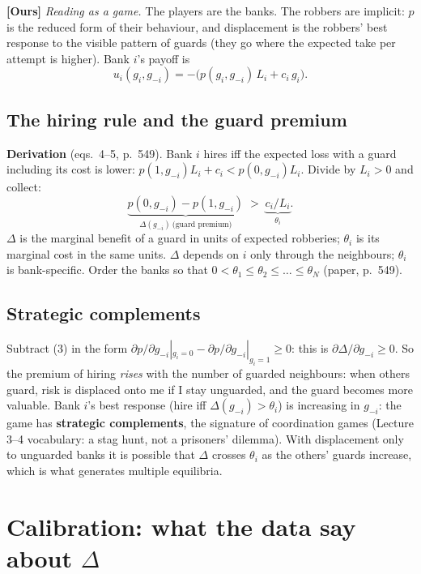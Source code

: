 \documentclass[11pt,a4paper]{article}
\newcommand{\ours}{\textbf{[Ours]}}
\newcommand{\Dl}{\Delta}
\begin{document}
\ours{} \emph{Reading as a game.} The players are the banks. The robbers are implicit: $p$ is the
reduced form of their behaviour, and displacement is the robbers' best response to the visible
pattern of guards (they go where the expected take per attempt is higher). Bank $i$'s payoff is
\[
  u_i(g_i,g_{-i}) = -\bigl(p(g_i,g_{-i})\,L_i + c_i\,g_i\bigr).
\]

\subsection{The hiring rule and the guard premium}
\textbf{Derivation} (eqs.\ 4--5, p.\ 549). Bank $i$ hires iff the expected loss with a guard
including its cost is lower: $p(1,g_{-i})L_i + c_i < p(0,g_{-i})L_i$. Divide by $L_i>0$ and collect:
\[
  \underbrace{p(0,g_{-i})-p(1,g_{-i})}_{\Dl(g_{-i})\ \text{(guard premium)}} \;>\; \underbrace{c_i/L_i}_{\theta_i}.
\]
$\Dl$ is the marginal benefit of a guard in units of expected robberies; $\theta_i$ is its marginal cost in
the same units. $\Dl$ depends on $i$ only through the neighbours; $\theta_i$ is bank-specific. Order the
banks so that $0<\theta_1\le\theta_2\le\dots\le\theta_N$ (paper, p.\ 549).

\subsection{Strategic complements}
Subtract (3) in the form $\partial p/\partial g_{-i}|_{g_i=0}-\partial p/\partial g_{-i}|_{g_i=1}\ge0$: this is
$\partial\Dl/\partial g_{-i}\ge0$. So the premium of hiring \emph{rises} with the number of guarded
neighbours: when others guard, risk is displaced onto me if I stay unguarded, and the guard becomes more
valuable. Bank $i$'s best response (hire iff $\Dl(g_{-i})>\theta_i$) is increasing in $g_{-i}$: the game has
\textbf{strategic complements}, the signature of coordination games (Lecture 3--4 vocabulary: a stag
hunt, not a prisoners' dilemma). With displacement only to unguarded banks it is possible that
$\Dl$ crosses $\theta_i$ as the others' guards increase, which is what generates multiple equilibria.

\section{Calibration: what the data say about $\Dl$}
\end{document}
